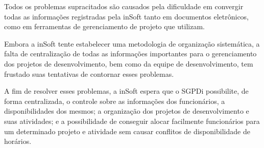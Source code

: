       Todos os problemas supracitados são causados pela dificuldade em convergir todas as informações registradas pela inSoft tanto em documentos eletrônicos, como em ferramentas de gerenciamento de projeto que utilizam.

      Embora a inSoft tente estabelecer uma metodologia de organização sistemática, a falta de centralização de todas as informações importantes para o gerenciamento dos projetos de desenvolvimento, bem como da equipe de desenvolvimento, tem frustado suas tentativas de contornar esses problemas.

      A fim de resolver esses problemas, a inSoft espera que o SGPDi possibilite, de forma centralizada, o controle sobre as informações dos funcionários, a disponibilidades dos mesmos; a organização dos projetos de desenvolvimento e suas atividades; e a possibilidade de conseguir alocar facilmente funcionários para um determinado projeto e atividade sem causar conflitos de disponibilidade de horários.

